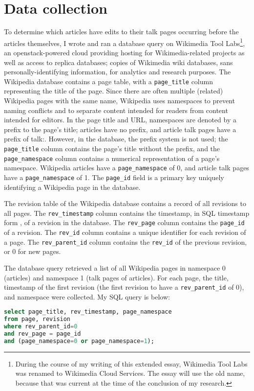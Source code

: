 \documentclass[14pt,a4paper]{report}
\begin{document}
\chapter{Data collection}
To determine which articles have edits to their talk pages occurring before the articles themselves, I wrote and ran a database query on Wikimedia Tool Labs\footnote{During the course of my writing of this extended essay, Wikimedia Tool Labs was renamed to Wikimedia Cloud Services. \autocite{wmfrenamed} The essay will use the old name, because that was current at the time of the conclusion of my research.}, an openstack-powered cloud providing hosting for Wikimedia-related projects as well as access to replica databases; copies of Wikimedia wiki databases, sans personally-identifying information, for analytics and research purposes. \autocite{wmflabs} The Wikipedia database contains a page table, with a \lstinline[language=sql]{page_title} column representing the title of the page. Since there are often multiple (related) Wikipedia pages with the same name, Wikipedia uses namespaces to prevent naming conflicts and to separate content intended for readers from content intended for editors. \autocite{namespace} In the page title and URL, namespaces are denoted by a prefix to the page's title; articles have no prefix, and article talk pages have a prefix of talk:. However, in the database, the prefix system is not used; the \lstinline[language=sql]{page_title} column contains the page's title without the prefix, and the \lstinline[language=sql]{page_namespace} column contains a numerical representation of a page's namespace. Wikipedia articles have a \lstinline[language=sql]{page_namespace} of 0, and article talk pages have a \lstinline[language=sql]{page_namespace} of 1. The \lstinline[language=sql]{page_id} field is a primary key uniquely identifying a Wikipedia page in the database.

The revision table of the Wikipedia database contains a record of all revisions to all pages. The \lstinline[language=sql]{rev_timestamp} column contains the timestamp, in SQL timestamp form \autocite{sqltime}, of a revision in the database. The \lstinline[language=sql]{rev_page} column contains the \lstinline[language=sql]{page_id} of a revision. The \lstinline[language=sql]{rev_id} column contains a unique identifier for each revision of a page. The \lstinline[language=sql]{rev_parent_id} column contains the \lstinline[language=sql]{rev_id} of the previous revision, or 0 for new pages.

The database query retrieved a list of all Wikipedia pages in namespace 0 (articles) and namespace 1 (talk pages of articles). For each page, the title, timestamp of the first revision (the first revision to have a \lstinline[language=sql]{rev_parent_id} of 0), and namespace were collected. My SQL query is below:
\begin{lstlisting}[language=sql]
select page_title, rev_timestamp, page_namespace
from page, revision
where rev_parent_id=0
and rev_page = page_id
and (page_namespace=0 or page_namespace=1);
\end{lstlisting}
\end{document}
